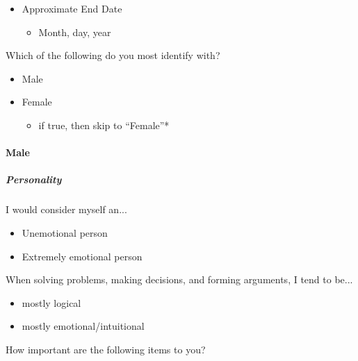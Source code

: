 \documentclass[twoside]{report}
\begin{document}
\begin{multicols}{2}
\begin{itemize}
\item
  Approximate End Date

  \begin{itemize}
  \item
    Month, day, year
  \end{itemize}
\end{itemize}

Which of the following do you most identify with?

\begin{itemize}
\item
  Male
\end{itemize}

\begin{itemize}
\item
  Female

  \begin{itemize}
  \item
    if true, then skip to ``Female''*
  \end{itemize}
\end{itemize}

\paragraph{Male}

\subparagraph{Personality}

I would consider myself an...

\begin{itemize}
\item
  Unemotional person
\end{itemize}

\begin{itemize}
\item
  Extremely emotional person
\end{itemize}

When solving problems, making decisions, and forming arguments, I tend
to be...

\begin{itemize}
\item
  mostly logical
\end{itemize}

\begin{itemize}
\item
  mostly emotional/intuitional
\end{itemize}

How important are the following items to you?


\end{multicols}
\end{document}
